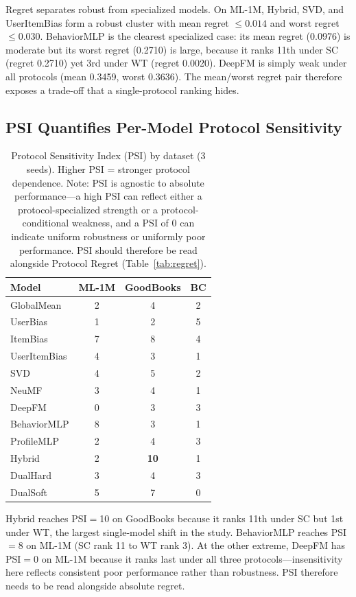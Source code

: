 \documentclass[journal]{IEEEtran}
\begin{document}
Regret separates robust from specialized models. On ML-1M, Hybrid, SVD, and UserItemBias form a robust cluster with mean regret $\leq 0.014$ and worst regret $\leq 0.030$. BehaviorMLP is the clearest specialized case: its mean regret (0.0976) is moderate but its worst regret (0.2710) is large, because it ranks 11th under SC (regret 0.2710) yet 3rd under WT (regret 0.0020). DeepFM is simply weak under all protocols (mean 0.3459, worst 0.3636). The mean/worst regret pair therefore exposes a trade-off that a single-protocol ranking hides.

\subsection{PSI Quantifies Per-Model Protocol Sensitivity}
\label{sec:psi_results}

\begin{table}[!t]
\centering
\caption{Protocol Sensitivity Index (PSI) by dataset (3 seeds). Higher PSI = stronger protocol dependence. Note: PSI is agnostic to absolute performance---a high PSI can reflect either a protocol-specialized strength or a protocol-conditional weakness, and a PSI of 0 can indicate uniform robustness or uniformly poor performance. PSI should therefore be read alongside Protocol Regret (Table~\ref{tab:regret}).}
\label{tab:psi}
\footnotesize
\begin{tabular}{@{}lccc@{}}
\toprule
Model & {ML-1M} & {GoodBooks} & {BC} \\
\midrule
GlobalMean    & 2 & 4  & 2 \\
UserBias      & 1 & 2  & 5 \\
ItemBias      & 7 & 8  & 4 \\
UserItemBias  & 4 & 3  & 1 \\
SVD           & 4 & 5  & 2 \\
NeuMF         & 3 & 4  & 1 \\
DeepFM        & 0 & 3  & 3 \\
BehaviorMLP   & 8 & 3  & 1 \\
ProfileMLP    & 2 & 4  & 3 \\
Hybrid        & 2 & \textbf{10} & 1 \\
DualHard      & 3 & 4  & 3 \\
DualSoft      & 5 & 7  & 0 \\
\bottomrule
\end{tabular}
\end{table}

Hybrid reaches PSI$=$10 on GoodBooks because it ranks 11th under SC but 1st under WT, the largest single-model shift in the study. BehaviorMLP reaches PSI$=$8 on ML-1M (SC rank 11 to WT rank 3). At the other extreme, DeepFM has PSI$=$0 on ML-1M because it ranks last under all three protocols---insensitivity here reflects consistent poor performance rather than robustness. PSI therefore needs to be read alongside absolute regret.
\end{document}
